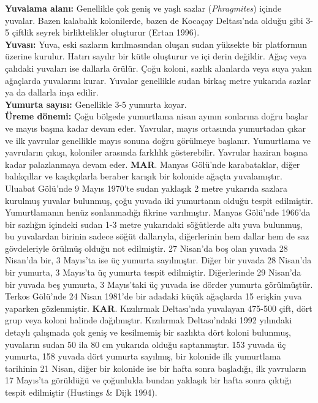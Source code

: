 \documentclass[
  letterpaper,
  DIV=11,
  numbers=noendperiod]{scrreprt}
\begin{document}
\textbf{Yuvalama alanı:} Genellikle çok geniş ve yaşlı sazlar
(\emph{Phragmites}) içinde yuvalar. Bazen kalabalık kolonilerde, bazen
de Kocaçay Deltası'nda olduğu gibi 3-5 çiftlik seyrek birliktelikler
oluşturur (Ertan 1996).\\
\textbf{Yuvası:} Yuva, eski sazların kırılmasından oluşan sudan yüksekte
bir platformun üzerine kurulur. Hatırı sayılır bir kütle oluşturur ve
içi derin değildir. Ağaç veya çalıdaki yuvaları ise dallarla örülür.
Çoğu koloni, sazlık alanlarda veya suya yakın ağaçlarda yuvalarını
kurar. Yuvalar genellikle sudan birkaç metre yukarıda sazlar ya da
dallarla inşa edilir.\\
\textbf{Yumurta sayısı:} Genellikle 3-5 yumurta koyar.\\
\textbf{Üreme dönemi:} Çoğu bölgede yumurtlama nisan ayının sonlarına
doğru başlar ve mayıs başına kadar devam eder. Yavrular, mayıs ortasında
yumurtadan çıkar ve ilk yavrular genellikle mayıs sonuna doğru görülmeye
başlanır. Yumurtlama ve yavruların çıkışı, koloniler arasında farklılık
gösterebilir. Yavrular haziran başına kadar palazlanmaya devam eder.
\textbf{MAR}. Manyas Gölü'nde karabataklar, diğer balıkçıllar ve
kaşıkçılarla beraber karışık bir kolonide ağaçta yuvalamıştır. Uluabat
Gölü'nde 9 Mayıs 1970'te sudan yaklaşık 2 metre yukarıda sazlara
kurulmuş yuvalar bulunmuş, çoğu yuvada iki yumurtanın olduğu tespit
edilmiştir. Yumurtlamanın henüz sonlanmadığı fikrine varılmıştır. Manyas
Gölü'nde 1966'da bir sazlığın içindeki sudan 1-3 metre yukarıdaki
söğütlerde altı yuva bulunmuş, bu yuvalardan birinin sadece söğüt
dallarıyla, diğerlerinin hem dallar hem de saz gövdeleriyle örülmüş
olduğu not edilmiştir. 27 Nisan'da boş olan yuvada 28 Nisan'da bir, 3
Mayıs'ta ise üç yumurta sayılmıştır. Diğer bir yuvada 28 Nisan'da bir
yumurta, 3 Mayıs'ta üç yumurta tespit edilmiştir. Diğerlerinde 29
Nisan'da bir yuvada beş yumurta, 3 Mayıs'taki üç yuvada ise dörder
yumurta görülmüştür. Terkos Gölü'nde 24 Nisan 1981'de bir adadaki küçük
ağaçlarda 15 erişkin yuva yaparken gözlenmiştir. \textbf{KAR}.
Kızılırmak Deltası'nda yuvalayan 475-500 çift, dört grup veya koloni
halinde dağılmıştır. Kızılırmak Deltası'ndaki 1992 yılındaki detaylı
çalışmada çok geniş ve kesilmemiş bir sazlıkta dört koloni bulunmuş,
yuvaların sudan 50 ila 80 cm yukarıda olduğu saptanmıştır. 153 yuvada üç
yumurta, 158 yuvada dört yumurta sayılmış, bir kolonide ilk yumurtlama
tarihinin 21 Nisan, diğer bir kolonide ise bir hafta sonra başladığı,
ilk yavruların 17 Mayıs'ta görüldüğü ve çoğunlukla bundan yaklaşık bir
hafta sonra çıktığı tespit edilmiştir (Hustings \& Dijk 1994).
\end{document}
